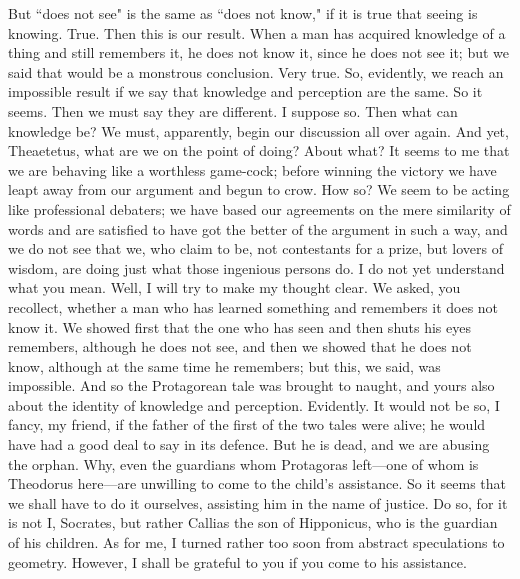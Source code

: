 \documentclass[letterpaper,12pt]{article}
\newcommand{\stephpag}[1]{\marginnote{\small\itshape\fontfamily{ppl}\selectfont #1}}
\begin{document}
\begin{drama}
\socratesspeaks
But ``does not see" is the same as ``does not know," if it is true that seeing is knowing.
\theaetetusspeaks
True.
\socratesspeaks
Then this is our result. When a man has acquired knowledge of a thing and still remembers it, he does not know it, since he does not see it; but we said that would be a monstrous conclusion.
\theaetetusspeaks
Very true.
\socratesspeaks
So, evidently, we reach an impossible result if we say that knowledge and perception are the same.
\theaetetusspeaks
So it seems.
\socratesspeaks
Then we must say they are different.
\theaetetusspeaks
I suppose so. \stephpag{c}
\socratesspeaks
Then what can knowledge be? We must, apparently, begin our discussion all over again. And yet, Theaetetus, what are we on the point of doing?
\theaetetusspeaks
About what?
\socratesspeaks
It seems to me that we are behaving like a worthless game-cock; before winning the victory we have leapt away from our argument and begun to crow.
\theaetetusspeaks
How so?
\socratesspeaks
We seem to be acting like professional debaters; we have based our agreements on the mere similarity of words and are satisfied to have got the better of the argument in such a way, and we do not see that we, who claim to be, not contestants for a prize, but lovers of wisdom, \stephpag{d} are doing just what those ingenious persons do.
\theaetetusspeaks
I do not yet understand what you mean.
\socratesspeaks
Well, I will try to make my thought clear. We asked, you recollect, whether a man who has learned something and remembers it does not know it. We showed first that the one who has seen and then shuts his eyes remembers, although he does not see, and then we showed that he does not know, although at the same time he remembers; but this, we said, was impossible. And so the Protagorean tale was brought to naught, and yours also about the identity of knowledge and perception. \stephpag{e}
\theaetetusspeaks
Evidently.
\socratesspeaks
It would not be so, I fancy, my friend, if the father of the first of the two tales were alive; he would have had a good deal to say in its defence. But he is dead, and we are abusing the orphan. Why, even the guardians whom Protagoras left—one of whom is Theodorus here—are unwilling to come to the child's assistance. So it seems that we shall have to do it ourselves, assisting him in the name of justice.
\theodorusspeaks
Do so, for it is not I, Socrates, but rather \stephpag{165 a} Callias the son of Hipponicus, who is the guardian of his children. As for me, I turned rather too soon from abstract speculations to geometry. However, I shall be grateful to you if you come to his assistance.

\end{drama}
\end{document}
